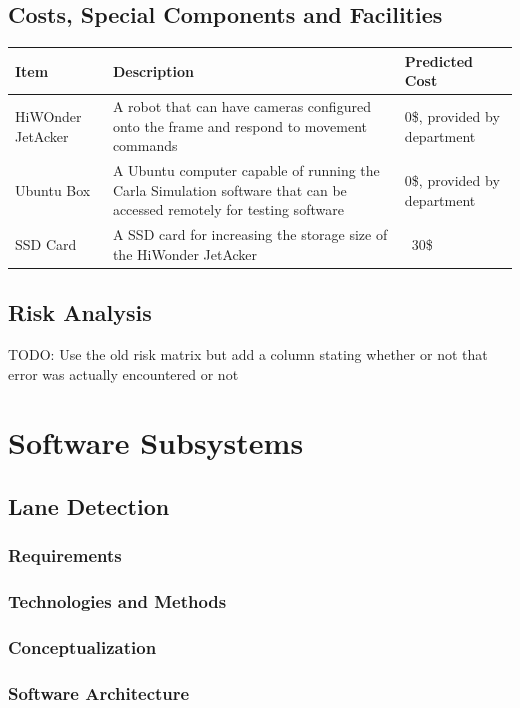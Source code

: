 \documentclass[titlepage]{article}
\begin{document}
\subsection{Costs, Special Components and Facilities}
\begin{center}
	\begin{tabular}{|p{1in} | p{4in} | p{1in} |} 
	 \hline
	 Item & Description & Predicted Cost \\ [0.5ex] 
	 \hline
	 HiWOnder JetAcker & A robot that can have cameras configured onto the frame and respond to movement commands & 0\$, provided by department \\
	 \hline
	 Ubuntu Box & A Ubuntu computer capable of running the Carla Simulation software that can be accessed remotely for testing software & 0\$, provided by department \\
	 \hline
	 SSD Card & A SSD card for increasing the storage size of the HiWonder JetAcker & ~30\$ \\
	 \hline
	\end{tabular}
	\end{center}

\subsection{Risk Analysis}
TODO: Use the old risk matrix but add a column stating whether or not that error was actually encountered or not

\section{Software Subsystems}

\subsection{Lane Detection}
\subsubsection{Requirements}
\subsubsection{Technologies and Methods}
\subsubsection{Conceptualization}
\subsubsection{Software Architecture}
\end{document}
